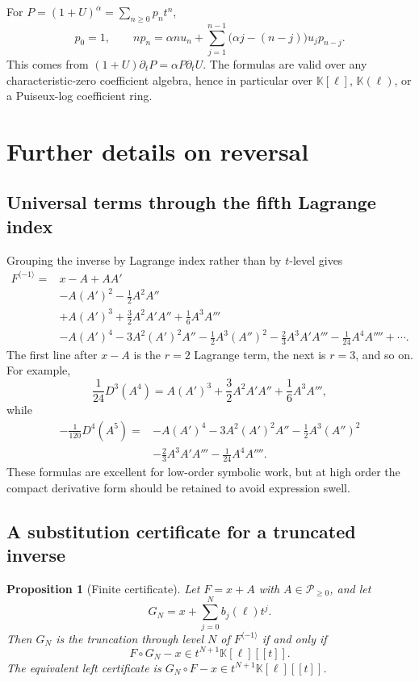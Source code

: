 \documentclass[11pt,oneside]{article}
\numberwithin{equation}{section}
\newtheorem{proposition}[theorem]{Proposition}
\theoremstyle{definition}
\newcommand{\K}{\mathbb K}
\newcommand{\PL}{\mathscr P}
\newcommand{\rev}{\langle -1\rangle}
\begin{document}
For \(P=(1+U)^\alpha=\sum_{n\ge0}p_nt^n\),
\begin{equation}\label{eq:power-coefficient-recurrence}
  p_0=1,
  \qquad
  np_n=\alpha n u_n+
   \sum_{j=1}^{n-1}\bigl(\alpha j-(n-j)\bigr)u_jp_{n-j}.
\end{equation}
This comes from \((1+U)\partial_tP=\alpha P\partial_tU\).  The formulas are
valid over any characteristic-zero coefficient algebra, hence in particular
over \(\K[\ell]\), \(\K(\ell)\), or a Puiseux-log coefficient ring.

\section{Further details on reversal}\label{app:reversal}

\subsection{Universal terms through the fifth Lagrange index}

Grouping the inverse by Lagrange index rather than by \(t\)-level gives
\begin{align}
 F^{\rev}={}&x-A
 +AA'\nonumber\\
 &-A(A')^2-\frac12A^2A''\nonumber\\
 &+A(A')^3+\frac32A^2A'A''+\frac16A^3A'''\nonumber\\
 &-A(A')^4-3A^2(A')^2A''-\frac12A^3(A'')^2
   -\frac23A^3A'A'''-\frac1{24}A^4A''''
 +\cdots.\label{eq:inverse-universal-through-five}
\end{align}
The first line after \(x-A\) is the \(r=2\) Lagrange term, the next is
\(r=3\), and so on.  For example,
\[
 \frac{1}{24}D^3(A^4)
 =A(A')^3+\frac32A^2A'A''+\frac16A^3A''',
\]
while
\begin{align*}
 -\frac1{120}D^4(A^5)={}&-A(A')^4-3A^2(A')^2A''
 -\frac12A^3(A'')^2\\
 &-\frac23A^3A'A'''-\frac1{24}A^4A''''.
\end{align*}
These formulas are excellent for low-order symbolic work, but at high order the
compact derivative form should be retained to avoid expression swell.

\subsection{A substitution certificate for a truncated inverse}

\begin{proposition}[Finite certificate]\label{prop:inverse-certificate}
Let \(F=x+A\) with \(A\in\PL_{\ge0}\), and let
\[
  G_N=x+\sum_{j=0}^{N}b_j(\ell)t^j.
\]
Then \(G_N\) is the truncation through level \(N\) of \(F^{\rev}\) if and only
if
\begin{equation}\label{eq:inverse-certificate}
  F\circ G_N-x\in t^{N+1}\K[\ell][[t]].
\end{equation}
The equivalent left certificate is
\(G_N\circ F-x\in t^{N+1}\K[\ell][[t]]\).
\end{proposition}
\end{document}
